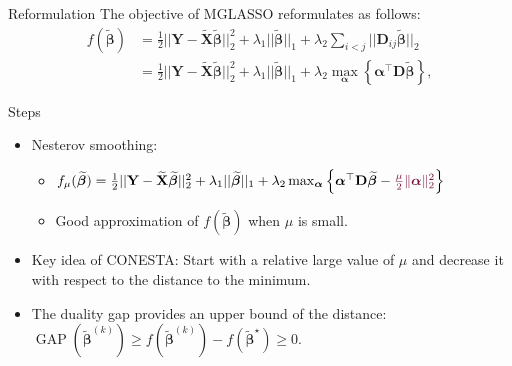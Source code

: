 \documentclass[11pt]{beamer}
\begin{document}
\begin{frame}{Reformulation}
The objective of MGLASSO reformulates as follows:
\small \begin{equation*}
	\begin{split}
		f(\widetilde{\boldsymbol{\beta}}) &= \frac{1}{2} ||\mathbf{Y} - \widetilde{\mathbf{X}}
		\widetilde{\boldsymbol{\beta}}||_2^2 + 
		\lambda_1 ||\widetilde{\boldsymbol{\beta}}||_1 +
		\lambda_2 \sum_{i<j} ||\boldsymbol D_{ij} \widetilde{\boldsymbol{\beta}}||_2 \\
		&= \frac{1}{2} ||\mathbf{Y} - \widetilde{\mathbf{X}}
		\widetilde{\boldsymbol{\beta}}||_2^2 + 
		\lambda_1 ||\widetilde{\boldsymbol{\beta}}||_1 +
		\lambda_2 \max_{\boldsymbol{\alpha}
		} \left \{ \boldsymbol{\alpha}^{\top} \mathbf{D} \widetilde{\boldsymbol{\beta}}  \right \},
	\end{split}
\end{equation*}

\begin{block}{Steps}
	\begin{itemize} 
		\item Nesterov smoothing: 
		\begin{itemize}
			\item $f_\mu(\widetilde{\boldsymbol{\beta}}) = \frac{1}{2} ||\mathbf{Y} - \widetilde{\mathbf{X}}
			\widetilde{\boldsymbol{\beta}}||_2^2 + 
			\lambda_1 ||\widetilde{\boldsymbol{\beta}}||_1 +
			\lambda_2 \max_{\boldsymbol{\alpha}
			} \left \{ \boldsymbol{\alpha}^{\top} \mathbf{D} \widetilde{\boldsymbol{\beta}} -
			\textcolor{Framaprune}{\frac{\mu}{2} \| \boldsymbol{\alpha} \|_2^2} \right \}$
			\item Good approximation of $f(\widetilde{\boldsymbol{\beta}})$ when $\mu$ is small.
		\end{itemize}
		
		\item Key idea of CONESTA: Start with a relative large value of $\mu$ and decrease it with respect to the distance to the minimum.   
		\item The duality gap provides an upper bound of the distance:
		$\operatorname{GAP}(\widetilde{\boldsymbol{\beta}}^{(k)}) \ge
		f(\widetilde{\boldsymbol{\beta}}^{(k)}) - f(\widetilde{\boldsymbol{\beta}}^\star) \ge 0.$
	\end{itemize}
\end{block}
\end{frame}
\end{document}
